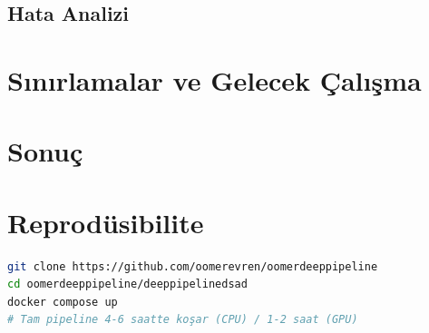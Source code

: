 \documentclass[10pt,a4paper]{article}
\begin{document}
\subsection{Hata Analizi}

\section{Sınırlamalar ve Gelecek Çalışma}

\section{Sonuç}



\appendix
\section{Reprodüsibilite}
\begin{lstlisting}[language=bash]
git clone https://github.com/oomerevren/oomerdeeppipeline
cd oomerdeeppipeline/deeppipelinedsad
docker compose up
# Tam pipeline 4-6 saatte koşar (CPU) / 1-2 saat (GPU)
\end{lstlisting}
\end{document}
